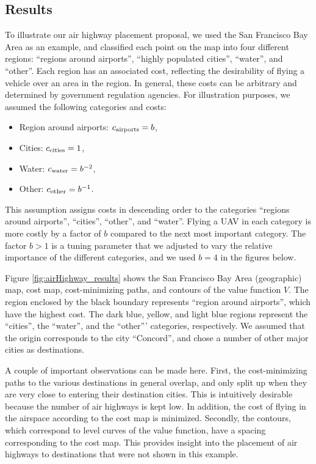 \subsection{Results}
To illustrate our air highway placement proposal, we used the San Francisco Bay Area as an example, and classified each point on the map into four different regions: ``regions around airports'', ``highly populated cities'', ``water'', and ``other''. Each region has an associated cost, reflecting the desirability of flying a vehicle over an area in the region. In general, these costs can be arbitrary and determined by government regulation agencies. For illustration purposes, we assumed the following categories and costs:

\begin{itemize}
\item Region around airports: $c_\text{airports}=b$,
\item Cities: $c_\text{cities}=1$,
\item Water: $c_\text{water}=b^{-2}$,
\item Other: $c_\text{other}=b^{-1}$.
\end{itemize}

This assumption assigns costs in descending order to the categories ``regions around airports'', ``cities'', ``other'', and ``water''. Flying a UAV in each category is more costly by a factor of $b$ compared to the next most important category. The factor $b>1$ is a tuning parameter that we adjusted to vary the relative importance of the different categories, and we used $b=4$ in the figures below.

Figure \ref{fig:airHighway_results} shows the San Francisco Bay Area (geographic) map, cost map, cost-minimizing paths, and contours of the value function $V$. The region enclosed by the black boundary represents ``region around airports'', which have the highest cost. The dark blue, yellow, and light blue regions represent the ``cities'', the ``water'', and the ``other''' categories, respectively. We assumed that the origin corresponds to the city ``Concord'', and chose a number of other major cities as destinations.

A couple of important observations can be made here. First, the cost-minimizing paths to the various destinations in general overlap, and only split up when they are very close to entering their destination cities. This is intuitively desirable because the number of air highways is kept low. In addition, the cost of flying in the airspace according to the cost map is minimized. Secondly, the contours, which correspond to level curves of the value function, have a spacing corresponding to the cost map. This provides insight into the placement of air highways to destinations that were not shown in this example.

